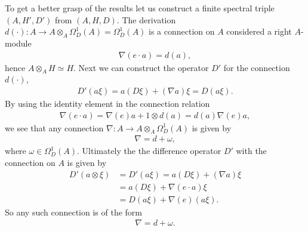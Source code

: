 To get a better grasp of the results let us construct a finite spectral
triple $(A, H', D')$ from $(A, H, D)$. The derivation $d(\cdot):A \rightarrow
A\otimes _A \Omega_D^1(A)=\Omega_D^1(A)$ is a connection on $A$ considered a
right $A$-module
\begin{align}
        \nabla(e \cdot a) =  d(a),
\end{align}
hence $A\otimes_A H\simeq H$. Next we can construct the operator $D'$
for the connection $d(\cdot)$,
\begin{align}
    D'(a\xi) = a(D\xi) + (\nabla a) \xi = D(a\xi).
\end{align}
By using the identity element in the connection relation
\begin{align}
   \nabla (e\cdot a) = \nabla(e) a + 1 \otimes d(a)=d(a) \nabla(e) a,
\end{align}
we see that any connection $\nabla: A\rightarrow A\otimes_A \Omega_D^1(A)$ is
given by
\begin{align}
    \nabla = d + \omega,
\end{align}
where $\omega \in \Omega_D^1(A)$. Ultimately the the
difference operator $D'$ with the connection on $A$ is given by
\begin{align}
    D'(a\otimes \xi) &= D'(a \xi) = a(D\xi) + (\nabla a)\xi \nonumber \\
                     &=a(D\xi) + \nabla(e \cdot a) \xi \nonumber\\
                     &= D(a\xi) + \nabla(e) (a\xi).
\end{align}
So any such connection is of the form
\begin{align}
    \nabla = d + \omega.
\end{align}

